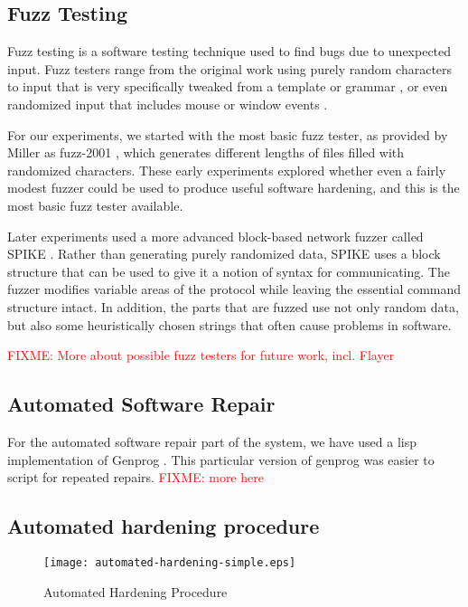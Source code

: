 \documentclass[conference]{IEEEtran}
\newcommand{\FIXME}[1]{\textcolor{red}{FIXME: #1}}
\begin{document}
\subsection{Fuzz Testing}

Fuzz testing is a software testing technique used to find bugs due to unexpected
input.  Fuzz testers range from the original work using purely random characters
\cite{Miller1990,Miller1995} to input that is very specifically tweaked from a
template or grammar \cite{modern,fuzz,papers}, or even randomized input that
includes mouse or window events \cite{Miller2006}.

For our experiments, we started with the most basic fuzz tester,
as provided by Miller as fuzz-2001 \cite{Millerfuzzwebsite}, which generates
different lengths of files filled with randomized characters.  These early
experiments explored whether even a fairly modest fuzzer could be used to
produce useful software hardening, and this is the most basic fuzz tester
available.

Later experiments used a more advanced block-based network fuzzer called SPIKE
\cite{SPIKE}.  Rather than generating purely randomized data, SPIKE uses a block
structure that can be used to give it a notion of syntax for communicating.
The fuzzer modifies variable areas of the protocol while leaving the essential
command structure intact.  In addition, the parts that are fuzzed use not only
random data, but also some heuristically chosen strings that often cause
problems in software. 

\FIXME{More about possible fuzz testers for future work, incl. Flayer}


\subsection{Automated Software Repair}

For the automated software repair part of the system, we have used a lisp
implementation of Genprog \cite{genprogpapers}.   This particular version of
genprog was easier to script for repeated repairs.  \FIXME{more here}

\subsection{Automated hardening procedure}

\begin{figure}[htb]
  \caption{Automated Hardening Procedure}
  \label{fig:flowchart}
  \centering
    \texttt{[image: automated-hardening-simple.eps]}
%
\end{figure}
\end{document}
